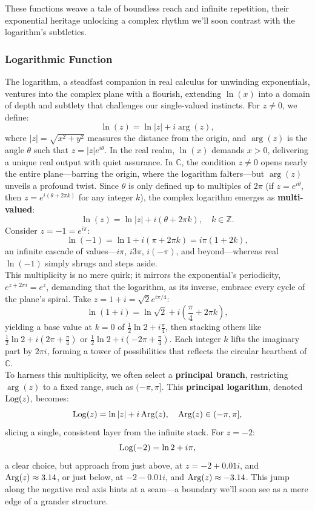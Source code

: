 \noindent These functions weave a tale of boundless reach and infinite repetition, their exponential heritage unlocking a complex rhythm we’ll soon contrast with the logarithm’s subtleties.

\subsubsection*{Logarithmic Function} 

\noindent The logarithm, a steadfast companion in real calculus for unwinding exponentials, ventures into the complex plane with a flourish, extending $\ln(x)$ into a domain of depth and subtlety that challenges our single-valued instincts. For $z \neq 0$, we define:
\[
\ln(z) = \ln|z| + i \arg(z),
\]
\noindent where $|z| = \sqrt{x^2 + y^2}$ measures the distance from the origin, and $\arg(z)$ is the angle $\theta$ such that $z = |z| e^{i\theta}$. In the real realm, $\ln(x)$ demands $x > 0$, delivering a unique real output with quiet assurance. In $\mathbb{C}$, the condition $z \neq 0$ opens nearly the entire plane—barring the origin, where the logarithm falters—but $\arg(z)$ unveils a profound twist. Since $\theta$ is only defined up to multiples of $2\pi$ (if $z = e^{i\theta}$, then $z = e^{i(\theta + 2\pi k)}$ for any integer $k$), the complex logarithm emerges as \textbf{multi-valued}:
\[
\ln(z) = \ln|z| + i (\theta + 2\pi k), \quad k \in \mathbb{Z}.
\]
\noindent Consider $z = -1 = e^{i\pi}$:
\[
\ln(-1) = \ln 1 + i (\pi + 2\pi k) = i \pi (1 + 2 k),
\]
an infinite cascade of values—$i\pi$, $i3\pi$, $i(-\pi)$, and beyond—whereas real $\ln(-1)$ simply shrugs and steps aside. \\

\noindent This multiplicity is no mere quirk; it mirrors the exponential’s periodicity, $e^{z + 2\pi i} = e^z$, demanding that the logarithm, as its inverse, embrace every cycle of the plane’s spiral. Take $z = 1 + i = \sqrt{2} e^{i\pi/4}$:
\[
\ln(1 + i) = \ln \sqrt{2} + i \left( \frac{\pi}{4} + 2\pi k \right),
\]
yielding a base value at $k = 0$ of $\frac{1}{2} \ln 2 + i \frac{\pi}{4}$, then stacking others like $\frac{1}{2} \ln 2 + i (2\pi + \frac{\pi}{4})$ or $\frac{1}{2} \ln 2 + i (-2\pi + \frac{\pi}{4})$. Each integer $k$ lifts the imaginary part by $2\pi i$, forming a tower of possibilities that reflects the circular heartbeat of $\mathbb{C}$. \\

\noindent To harness this multiplicity, we often select a \textbf{principal branch}, restricting $\arg(z)$ to a fixed range, such as $(-\pi, \pi]$. This \textbf{principal logarithm}, denoted $\operatorname{Log}(z)$, becomes:
\[
\operatorname{Log}(z) = \ln|z| + i \operatorname{Arg}(z), \quad \operatorname{Arg}(z) \in (-\pi, \pi],
\]
slicing a single, consistent layer from the infinite stack. For $z = -2$:
\[
\operatorname{Log}(-2) = \ln 2 + i \pi,
\]
\noindent a clear choice, but approach from just above, at $z = -2 + 0.01i$, and $\operatorname{Arg}(z) \approx 3.14$, or just below, at $-2 - 0.01i$, and $\operatorname{Arg}(z) \approx -3.14$. This jump along the negative real axis hints at a seam—a boundary we’ll soon see as a mere edge of a grander structure. \\

